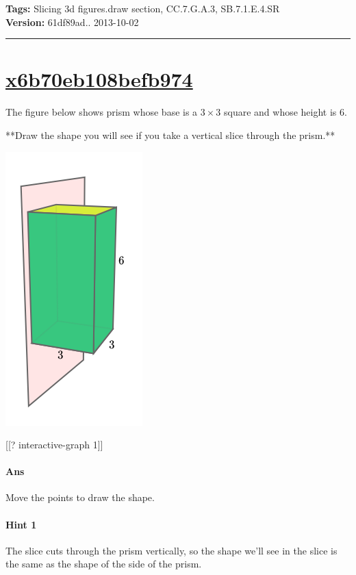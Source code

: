 \documentclass[twocolumn,10pt]{article}
\def\shrinkfactor{0.55}
\begin{document}
\medskip
\noindent
\textbf{Tags:} {\footnotesize Slicing 3d figures.draw section, CC.7.G.A.3, SB.7.1.E.4.SR}\\
\textbf{Version:} 61df89ad.. 2013-10-02
\smallskip\hrule





\section{\href{https://www.khanacademy.org/devadmin/content/items/x6b70eb108befb974}{x6b70eb108befb974}}

\noindent
The figure below shows prism whose base is a $3\times 3$ square and whose height is $6$.   

**Draw the shape you will see if you take a vertical slice through the prism.**


\includegraphics[scale=\shrinkfactor]{figures/94bf14f4775048a20e633abd42558d8e108ecfab.png}

[[? interactive-graph 1]] 

\paragraph{Ans} Move the points to draw the shape. 

\paragraph{Hint 1}The slice cuts through the prism vertically, so the shape we'll see in the slice is the same as the shape of the side of the prism.
\end{document}
